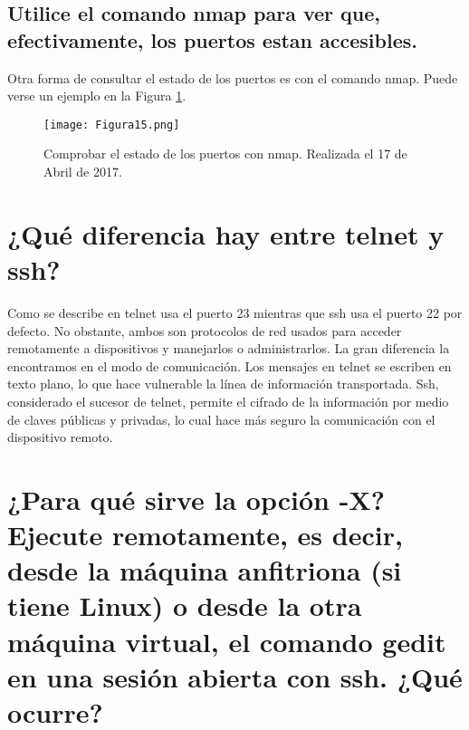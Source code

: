 \vspace{6mm}

\subsection{Utilice el comando nmap para ver que, efectivamente, los puertos estan accesibles.}

Otra forma de consultar el estado de los puertos es con el comando nmap. Puede verse un ejemplo en la Figura \ref{fig:figura15}.

\begin{figure}[H] 
\centering
\texttt{[image: Figura15.png]}  
\caption{Comprobar el estado de los puertos con nmap. Realizada el 17 de Abril de 2017.} \label{fig:figura15}
\end{figure}






\section{¿Qué diferencia hay entre telnet y ssh?}

Como se describe en \cite{telnetvsssh} telnet usa el puerto 23 mientras que ssh usa el puerto 22 por defecto. No obstante, ambos son protocolos de red usados
para acceder remotamente a dispositivos y manejarlos o administrarlos. La gran diferencia la encontramos en el modo de comunicación. Los mensajes en telnet 
se escriben en texto plano, lo que hace vulnerable la línea de información transportada. Ssh, considerado el sucesor de telnet, permite el cifrado de la información 
por medio de claves públicas y privadas, lo cual hace más seguro la comunicación con el dispositivo remoto. 






\section{¿Para qué sirve la opción -X? Ejecute remotamente, es decir, desde la máquina anfitriona (si tiene Linux) o desde la otra máquina virtual, el comando gedit en una sesión abierta con ssh. ¿Qué ocurre?}


